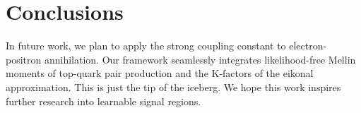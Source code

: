 \section{Conclusions}\label{sec:conclusions}

In future work, we plan to apply the strong coupling constant to
electron-positron annihilation. Our framework seamlessly integrates
likelihood-free Mellin moments of top-quark pair production and the
K-factors of the eikonal approximation. This is just the tip of the
iceberg. We hope this work inspires further research into learnable
signal regions.

